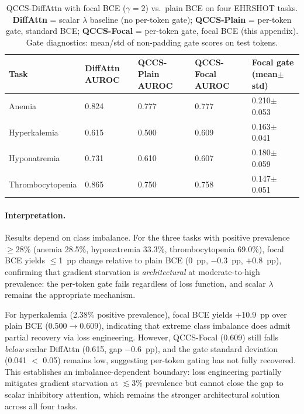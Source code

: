 \documentclass{article}
\begin{document}
\begin{table}[H]
\centering
\caption{QCCS-DiffAttn with focal BCE ($\gamma=2$) vs.\ plain BCE on
  four EHRSHOT tasks. \textbf{DiffAttn} = scalar $\lambda$ baseline (no per-token gate);
  \textbf{QCCS-Plain} = per-token gate, standard BCE; \textbf{QCCS-Focal} =
  per-token gate, focal BCE (this appendix).
  Gate diagnostics: mean/std of non-padding gate scores on test tokens.}
\label{tab:focal}
\small
\begin{tabular}{@{}lp{2.0cm}p{2.0cm}p{2.5cm}p{2.2cm}@{}}
\toprule
Task & DiffAttn AUROC & QCCS-Plain AUROC & QCCS-Focal AUROC & Focal gate (mean$\pm$std) \\
\midrule
Anemia         & 0.824 & 0.777 & 0.777 & 0.210$\pm$0.053 \\
Hyperkalemia   & 0.615 & 0.500 & 0.609 & 0.163$\pm$0.041 \\
Hyponatremia   & 0.731 & 0.610 & 0.607 & 0.180$\pm$0.059 \\
Thrombocytopenia & 0.865 & 0.750 & 0.758 & 0.147$\pm$0.051 \\
\bottomrule
\end{tabular}
\end{table}

\paragraph{Interpretation.}
Results depend on class imbalance.
For the three tasks with positive prevalence $\geq$28\% (anemia 28.5\%, hyponatremia
33.3\%, thrombocytopenia 69.0\%), focal BCE yields $\leq$1~pp change relative to
plain BCE (0~pp, $-$0.3~pp, $+$0.8~pp), confirming that gradient starvation is
\emph{architectural} at moderate-to-high prevalence: the per-token gate fails
regardless of loss function, and scalar $\lambda$ remains the appropriate mechanism.

For hyperkalemia (2.38\% positive prevalence), focal BCE yields $+$10.9~pp over
plain BCE (0.500$\to$0.609), indicating that extreme class imbalance does admit
partial recovery via loss engineering. However, QCCS-Focal (0.609) still falls
\emph{below} scalar DiffAttn (0.615, gap $-$0.6~pp), and the gate standard deviation
(0.041 $<$ 0.05) remains low, suggesting per-token gating has not fully recovered.
This establishes an imbalance-dependent boundary: loss engineering partially mitigates
gradient starvation at $\lesssim$3\% prevalence but cannot close the gap to scalar
inhibitory attention, which remains the stronger architectural solution across all four tasks.
\end{document}
